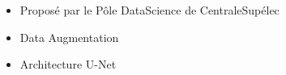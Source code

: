 \documentclass[10pt]{src/altacv}
\begin{document}
\begin{paracol}{2}
\divider

%

\begin{itemize}
    \item Proposé par le Pôle DataScience de CentraleSupélec
    \item Data Augmentation
    \item Architecture U-Net
\end{itemize}

\divider

%
%
%

\switchcolumn


\end{paracol}
\end{document}
